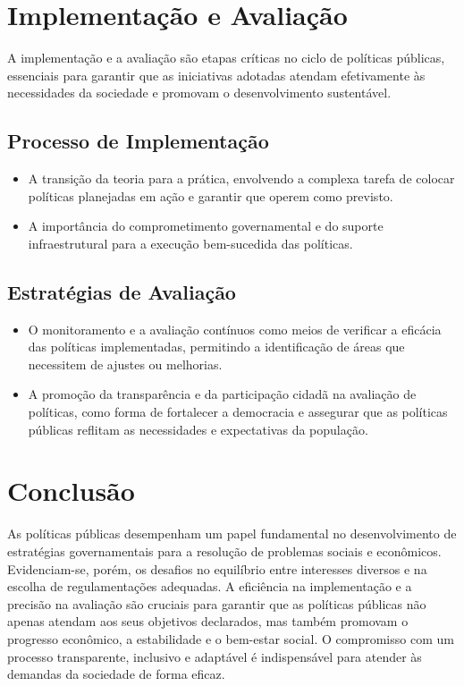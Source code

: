 \documentclass[
   article,       
   12pt,          
   oneside,       
   a4paper,       
   english,       
   brazil,        
   sumario=tradicional
   ]{abntex2}
\begin{document}
\section{Implementação e Avaliação}
A implementação e a avaliação são etapas críticas no ciclo de políticas públicas, essenciais para garantir que as iniciativas adotadas atendam efetivamente às necessidades da sociedade e promovam o desenvolvimento sustentável.
    \subsection{Processo de Implementação}
        \begin{itemize}
            \item A transição da teoria para a prática, envolvendo a complexa tarefa de colocar políticas planejadas em ação e garantir que operem como previsto.
            \item A importância do comprometimento governamental e do suporte infraestrutural para a execução bem-sucedida das políticas.
        \end{itemize}
    \subsection{Estratégias de Avaliação}
        \begin{itemize}
            \item O monitoramento e a avaliação contínuos como meios de verificar a eficácia das políticas implementadas, permitindo a identificação de áreas que necessitem de ajustes ou melhorias.
            \item A promoção da transparência e da participação cidadã na avaliação de políticas, como forma de fortalecer a democracia e assegurar que as políticas públicas reflitam as necessidades e expectativas da população.
        \end{itemize}

\section{Conclusão}
As políticas públicas desempenham um papel fundamental no desenvolvimento de estratégias governamentais para a resolução de problemas sociais e econômicos. Evidenciam-se, porém, os desafios no equilíbrio entre interesses diversos e na escolha de regulamentações adequadas. A eficiência na implementação e a precisão na avaliação são cruciais para garantir que as políticas públicas não apenas atendam aos seus objetivos declarados, mas também promovam o progresso econômico, a estabilidade e o bem-estar social. O compromisso com um processo transparente, inclusivo e adaptável é indispensável para atender às demandas da sociedade de forma eficaz.
\end{document}
